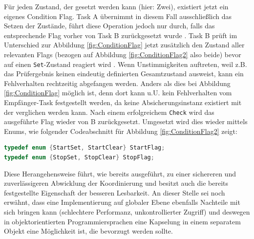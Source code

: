 \documentclass{llncs}
\begin{document}
Für jeden Zustand, der gesetzt werden kann (hier: Zwei), existiert jetzt ein eigenes Condition Flag. Task A übernimmt in diesem Fall ausschließlich das Setzen der Zustände, führt diese Operation jedoch nur durch, falls das entsprechende Flag vorher von Task B zurückgesetzt wurde \autocite[vgl.][85]{Cooling2017}. Task B prüft im Unterschied zur Abbildung \ref{fig:ConditionFlag} jetzt zusätzlich den Zustand aller relevanten Flags (bezogen auf Abbildung \ref{fig:ConditionFlag2} also beide) bevor auf einen \texttt{Set}-Zustand reagiert wird \autocite[vgl.][85]{Cooling2017}. Wenn Unstimmigkeiten auftreten, weil z.B. das Prüfergebnis keinen eindeutig definierten Gesamtzustand ausweist, kann ein Fehlverhalten rechtzeitig abgefangen werden. Anders als dies bei Abbildung \ref{fig:ConditionFlag} möglich ist, denn dort kann u.U. kein Fehlverhalten vom Empfänger-Task festgestellt werden, da keine Absicherungsinstanz existiert mit der verglichen werden kann. Nach einem erfolgreichem \texttt{Check} wird das ausgeführte Flag wieder von B zurückgesetzt. Umgesetzt wird dies wieder mittels Enums, wie folgender Codeabschnitt für Abbildung \ref{fig:ConditionFlag2} zeigt:
\begin{lstlisting}[language=C]
typedef enum {StartSet, StartClear} StartFlag;
typedef enum {StopSet, StopClear} StopFlag;
\end{lstlisting}
Diese Herangehensweise führt, wie bereits ausgeführt, zu einer sichereren und zuverlässigeren Abwicklung der Koordinierung und besitzt auch die bereits festgestellte Eigenschaft der besseren Lesbarkeit. An dieser Stelle sei noch erwähnt, dass eine Implementierung auf globaler Ebene ebenfalls Nachteile mit sich bringen kann (schlechtere Performanz, unkontrollierter Zugriff) und deswegen in objektorientierten Programmiersprachen eine Kapselung in einem separatem Objekt eine Möglichkeit ist, die bevorzugt werden sollte.\\
\end{document}
